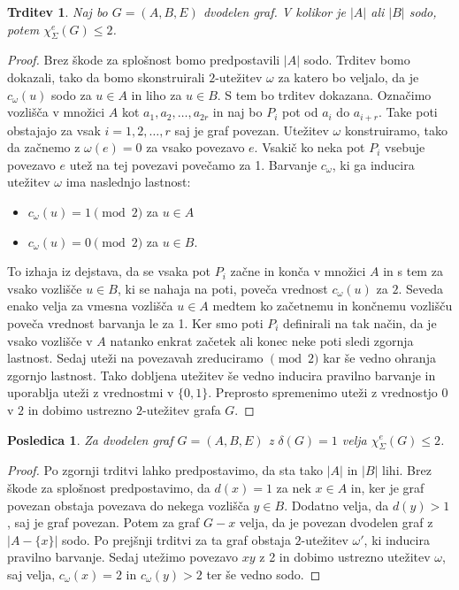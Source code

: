 \documentclass[12pt,a4paper,twoside]{article}
\theoremstyle{definition} %
\theoremstyle{plain} %
\newtheorem{trditev}[definicija]{Trditev}
\newtheorem{posledica}[definicija]{Posledica}
\newcommand{\ec}{\chi_{\Sigma}^e}
\numberwithin{equation}{section}  %
\begin{document}
\begin{trditev}
\label{dvosodo}	
Naj bo $G =(A,B,E)$ dvodelen graf. V kolikor je $|A|$ ali $|B|$ sodo, potem $\ec(G) \le 2$.
\end{trditev}
\begin{proof}
Brez škode za splošnost bomo predpostavili $|A|$ sodo. Trditev bomo dokazali, tako da bomo skonstruirali $2$-utežitev $\omega$ za katero bo veljalo, da je $c_{\omega}(u)$ sodo za $u \in A$ in liho za $u \in B$. S tem bo trditev dokazana. Označimo vozlišča v množici $A$ kot $a_1, a_2, \ldots, a_{2r}$ in naj bo $P_i$ pot od $a_i$ do $a_{i + r}$. Take poti obstajajo za vsak $i = 1, 2, \ldots, r$ saj je graf povezan. Utežitev $\omega$ konstruiramo, tako da začnemo z $\omega(e) = 0$ za vsako povezavo $e$. Vsakič ko neka pot $P_i$ vsebuje povezavo $e$ utež na tej povezavi povečamo za 1. Barvanje $c_{\omega}$, ki ga inducira utežitev $\omega$ ima naslednjo lastnost:
\begin{itemize}
\item $c_{\omega}(u) = 1 \pmod{2}$ za $u \in A$
\item $c_{\omega}(u) = 0 \pmod{2}$ za $u \in B$.
\end{itemize}
To izhaja iz dejstava, da se vsaka pot $P_i$ začne in konča v množici $A$ in s tem za vsako vozlišče $u \in B$, ki se nahaja na poti, poveča vrednost $c_{\omega}(u)$ za $2$. Seveda enako velja za vmesna vozlišča $u \in A$ medtem ko začetnemu in končnemu vozlišču poveča vrednost barvanja le za 1. Ker smo poti $P_i$ definirali na tak način, da je vsako vozlišče v $A$ natanko enkrat začetek ali konec neke poti sledi zgornja lastnost. Sedaj uteži na povezavah zreduciramo $\pmod{2}$ kar še vedno ohranja zgornjo lastnost. Tako dobljena utežitev še vedno inducira pravilno barvanje in uporablja uteži z vrednostmi  v $\{0,1\}$. Preprosto spremenimo uteži z vrednostjo $0$ v $2$ in dobimo ustrezno $2$-utežitev grafa $G$.
\end{proof}

\begin{posledica}
Za dvodelen graf $G = (A, B, E)$ z $\delta(G)=1$ velja $\ec(G)  \le 2$.
\end{posledica}
\begin{proof}
Po zgornji trditvi lahko predpostavimo, da sta tako $|A|$ in $|B|$ lihi. Brez škode za splošnost predpostavimo, da $d(x) = 1$ za nek $x \in A$ in, ker je graf povezan obstaja povezava do nekega vozlišča $y \in B$. Dodatno velja, da $d(y) > 1$, saj je graf povezan. Potem za graf $G - x$ velja, da je povezan dvodelen graf  z $|A -  \{x\}|$ sodo. Po prejšnji trditvi za ta graf obstaja $2$-utežitev $\omega'$, ki inducira pravilno barvanje. Sedaj utežimo povezavo $xy$ z 2 in dobimo ustrezno utežitev $\omega$, saj velja, $c_{\omega}(x) = 2$ in $c_{\omega}(y) > 2$ ter še vedno sodo.
\end{proof}
\end{document}
